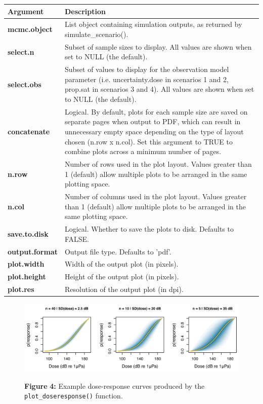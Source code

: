 \documentclass[
]{article}
\begin{document}
\renewcommand{\arraystretch}{1.4}

\begin{longtable}{>{\bfseries}l|>{\raggedright\arraybackslash}p{30em}}
\toprule
\textbf{Argument} & \textbf{Description}\\
\midrule
mcmc.object & List object containing simulation outputs, as returned by simulate\_scenario().\\
select.n & Subset of sample sizes to display. All values are shown when set to NULL (the default).\\
select.obs & Subset of values to display for the observation model parameter (i.e. uncertainty.dose in scenarios 1 and 2, prop.sat in scenarios 3 and 4). All values are shown when set to NULL (the default).\\
concatenate & Logical. By default, plots for each sample size are saved on separate pages when output to PDF, which can result in unnecessary empty space depending on the type of layout chosen (n.row x n.col). Set this argument to TRUE to combine plots across a minimum number of pages.\\
n.row & Number of rows used in the plot layout. Values greater than 1 (default) allow multiple plots to be arranged in the same plotting space.\\
\addlinespace
n.col & Number of columns used in the plot layout. Values greater than 1 (default) allow multiple plots to be arranged in the same plotting space.\\
save.to.disk & Logical. Whether to save the plots to disk. Defaults to FALSE.\\
output.format & Output file type. Defaults to 'pdf'.\\
plot.width & Width of the output plot (in pixels).\\
plot.height & Height of the output plot (in pixels).\\
\addlinespace
plot.res & Resolution of the output plot (in dpi).\\
\bottomrule
\end{longtable}



\begin{figure}

{\centering \includegraphics[width=1\linewidth]{fig/fig_doseresponse_plots} 

}

\textbf{Figure }{\textbf{4:} \hypertarget{fig4}{}Example dose-response curves produced by the \texttt{plot\_doseresponse()} function.}\label{fig:unnamed-chunk-10}
\end{figure}
\end{document}
